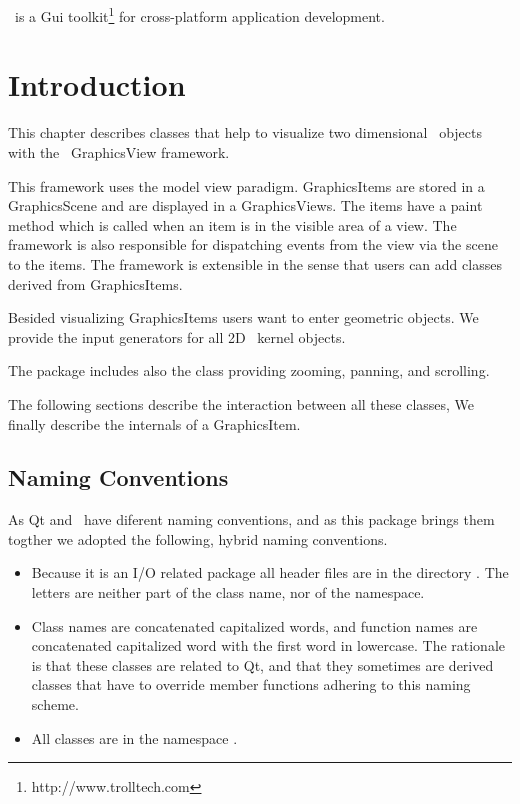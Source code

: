 

\qt\ is a {\sc Gui} toolkit\footnote{http://www.trolltech.com} for
cross-platform application development. 

\section{Introduction}

This chapter describes classes that help to visualize two dimensional \cgal\ objects
with the \qt\ GraphicsView framework.

This framework uses the model view paradigm. GraphicsItems are stored in a 
GraphicsScene and are displayed in a GraphicsViews. The items 
have a paint method which is called when an item is in the visible area of a view.
The framework is also responsible for dispatching events from the view
via the scene to the items. The framework is extensible in the sense
that users can add classes derived from GraphicsItems.

Besided visualizing GraphicsItems users want to enter geometric objects.
We provide the input generators for all 2D \cgal\ kernel objects.

The package includes also the class  providing zooming,
panning, and scrolling.


The following sections describe the interaction between all these classes,
We finally describe the internals of a GraphicsItem.

\subsection{Naming Conventions}

As Qt and \cgal\ have diferent naming conventions, and as this package
brings them togther we adopted the following, hybrid naming conventions.

\begin{itemize}
\item Because it is an I/O related package all header files are in the directory
. The letters  are neither part of the class name, nor 
      of the namespace.
\item Class names are concatenated capitalized words, and function names are
      concatenated capitalized word with the first word in lowercase. The rationale is that
      these classes are related to Qt, and that they sometimes are derived
      classes that have to override member functions adhering to this naming scheme.
\item All classes are in the namespace .
\end{itemize}
 


